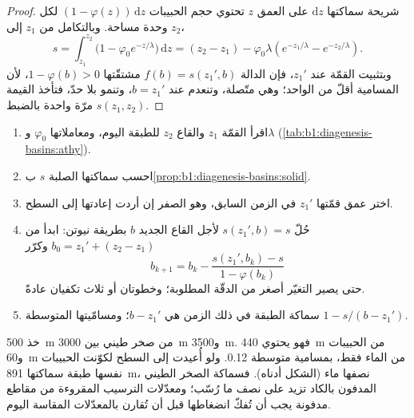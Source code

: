 \begin{proof}
شريحة سماكتها $\mathrm dz$ على العمق $z$ تحتوي حجم الحبيبات $(1 - \varphi(z))\,\mathrm dz$ لكل وحدة مساحة. وبالتكامل من $z_1$ إلى $z_2$،
\[
  s = \int_{z_1}^{z_2} \bigl(1 - \varphi_0 e^{-z/\lambda}\bigr)\,\mathrm dz
    = (z_2 - z_1) - \varphi_0\lambda\left(e^{-z_1/\lambda} - e^{-z_2/\lambda}\right).
\]
وبتثبيت القمّة عند $z_1'$، فإن الدالة $f(b) = s(z_1', b)$ مشتقّتها $1 - \varphi(b) > 0$، لأن المسامية أقلّ من الواحد؛ وهي متّصلة، وتنعدم عند $b = z_1'$، وتنمو بلا حدّ، فتأخذ القيمة $s(z_1, z_2)$ مرّة واحدة بالضبط.
\end{proof}

\begin{method}\label{met:b1:diagenesis-basins:decompaction}
\begin{enumerate}
  \item اقرأ القمّة $z_1$ والقاع $z_2$ للطبقة اليوم، ومعاملاتها $\varphi_0$ و$\lambda$ (\cref{tab:b1:diagenesis-basins:athy}).
  \item احسب سماكتها الصلبة $s$ ب\cref{prop:b1:diagenesis-basins:solid}.
  \item اختر عمق قمّتها $z_1'$ في الزمن السابق، وهو الصفر إن أردت إعادتها إلى السطح.
  \item حُلّ $s(z_1', b) = s$ لأجل القاع الجديد $b$ بطريقة نيوتن: ابدأ من $b_0 = z_1' + (z_2 - z_1)$ وكرّر
        \[
          b_{k+1} = b_k - \frac{s(z_1', b_k) - s}{1 - \varphi(b_k)}
        \]
        حتى يصير التغيّر أصغر من الدقّة المطلوبة؛ وخطوتان أو ثلاث تكفيان عادةً.
  \item سماكة الطبقة في ذلك الزمن هي $b - z_1'$؛ ومسامّيتها المتوسطة $1 - s/(b - z_1')$.
\end{enumerate}
\end{method}

خذ \qty{500}{m} من صخر طيني بين \qty{3000}{m} و\qty{3500}{m}. فهو يحتوي \qty{440}{m} من الحبيبات و\qty{60}{m} من الماء فقط، بمسامية متوسطة \num{0.12}. ولو أُعيدت إلى السطح لكوّنت الحبيبات نفسها طبقة سماكتها \qty{891}{m}، نصفها ماء (الشكل أدناه). فسماكة الصخر الطيني المدفون بالكاد تزيد على نصف ما رُسّب؛ ومعدّلات الترسيب المقروءة من مقاطع مدفونة يجب أن تُفكّ انضغاطها قبل أن تُقارن بالمعدّلات المقاسة اليوم.

